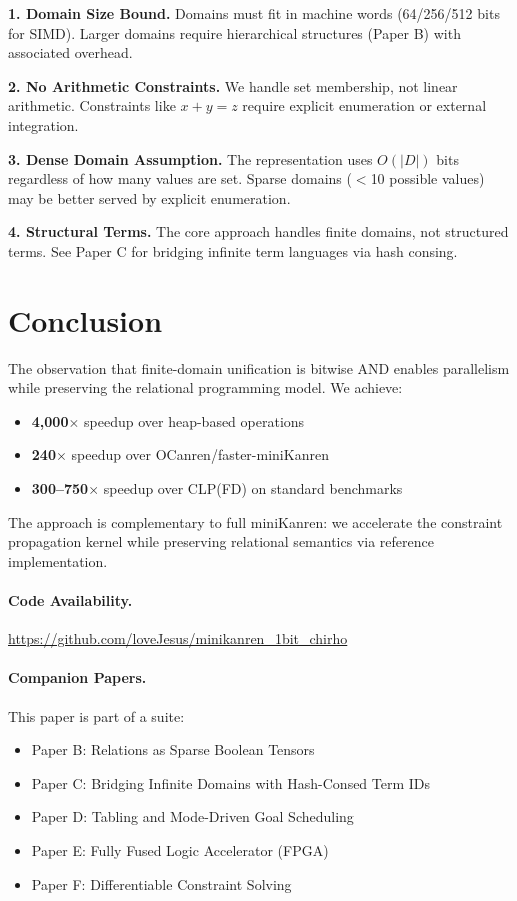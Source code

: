 \documentclass[11pt,a4paper]{article}
\begin{document}
\textbf{1. Domain Size Bound.}
Domains must fit in machine words (64/256/512 bits for SIMD).
Larger domains require hierarchical structures (Paper B) with associated overhead.

\textbf{2. No Arithmetic Constraints.}
We handle set membership, not linear arithmetic.
Constraints like $x + y = z$ require explicit enumeration or external integration.

\textbf{3. Dense Domain Assumption.}
The representation uses $O(|D|)$ bits regardless of how many values are set.
Sparse domains ($<$10 possible values) may be better served by explicit enumeration.

\textbf{4. Structural Terms.}
The core approach handles finite domains, not structured terms.
See Paper C for bridging infinite term languages via hash consing.

\section{Conclusion}

The observation that finite-domain unification is bitwise AND enables
parallelism while preserving the relational programming model.
We achieve:
\begin{itemize}
  \item \textbf{4,000$\times$} speedup over heap-based operations
  \item \textbf{240$\times$} speedup over OCanren/faster-miniKanren
  \item \textbf{300--750$\times$} speedup over CLP(FD) on standard benchmarks
\end{itemize}

The approach is complementary to full miniKanren: we accelerate the constraint
propagation kernel while preserving relational semantics via reference implementation.

\paragraph{Code Availability.}
\url{https://github.com/loveJesus/minikanren_1bit_chirho}

\paragraph{Companion Papers.}
This paper is part of a suite:
\begin{itemize}
  \item Paper B: Relations as Sparse Boolean Tensors
  \item Paper C: Bridging Infinite Domains with Hash-Consed Term IDs
  \item Paper D: Tabling and Mode-Driven Goal Scheduling
  \item Paper E: Fully Fused Logic Accelerator (FPGA)
  \item Paper F: Differentiable Constraint Solving
\end{itemize}
\end{document}
